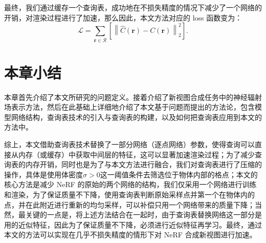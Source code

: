 最终，我们通过缓存一个查询表，成功地在不损失精度的情况下减少了一个网络的开销，对渲染过程进行了加速，那么因此，本文方法对应的 loss 函数变为：
\begin{equation}
    \mathcal{L} = \sum_{\symbf{r}\in \mathcal{R}}\left[\left\|\hat{C}\left(\symbf{r}\right) - C\left(\symbf{r}\right)\right\|_{2}^{2} \right].
    \label{eq:fnerf_loss}
\end{equation}

\section{本章小结}
本章首先介绍了本文所研究的问题定义。接着介绍了新视图合成任务中的神经辐射场表示方法，然后在此基础上详细地介绍了本文基于问题而提出的方法论，包含模型网络结构，查询表技术的引入与查询表的构建，以及如何把查询表应用到本文的方法中。

综上，本文借助查询表技术替换了一部分网络（逐点网络）参数，使得查询可以直接从内存（或缓存）中获取中间层的特征，这可以显著加速渲染过程；为了减少查询表的内存开销，同时也是为了与本文方法进行融合，我们对查询表进行了压缩的操作，具体是使用体密度$\sigma > 0$这一阈值条件去筛选位于物体内部的格点；本文的核心方法是减少 NeRF 的原始的两个网络的结构，我们仅采用一个网络进行训练和渲染，为了保证质量不下降，使用查询表判断原始采样点并第一个在物体内的点，并在此附近进行重新的均匀采样，可以补偿只用一个网络带来的质量下降；当然，最关键的一点是，将上述方法结合在一起时，由于查询表替换网络这一部分是用的近似特征，因此为了保证质量不下降，必须进行近似特征再学习。最终，通过本文的方法可以实现在几乎不损失精度的情形下对 NeRF 合成新视图进行加速。

\cleardoublepage
